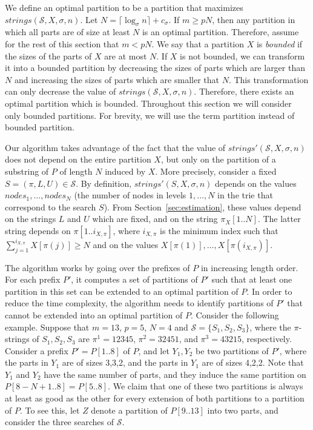 \documentclass[12pt]{article}
\newcommand{\substr}[3]{#1[#2..#3]}
\newcommand{\scheme}{\mathcal{S}}
\newcommand{\partition}{X}
\newcommand{\numstrings}{\mathit{strings}}
\newcommand{\numstringsp}{\numstrings'}
\newcommand{\numnodes}[1]{\mathit{nodes}_{#1}}
\newcommand{\logn}{N}
\newcommand{\lognc}{N}
\newcommand{\ppartition}{Y}
\newcommand{\spartition}{Z}
\begin{document}
We define an optimal partition to be a partition that maximizes
$\numstrings(\scheme,\partition,\sigma,n)$.
Let $\lognc=\lceil\log_{\sigma} n\rceil+c_\sigma$.
If $m \geq p \lognc$, then any partition in which all parts are of size at least
$\lognc$ is an optimal partition.
Therefore, assume for the rest of this section that $m < p \lognc$.
We say that a partition $\partition$ is \emph{bounded} if the sizes of the parts
of $\partition$ are at most $\lognc$.
If $\partition$ is not bounded, we can transform it into a bounded
partition by decreasing the sizes of parts which are larger than $\lognc$
and increasing the sizes of parts which are smaller that $\lognc$.
This transformation 
can only decrease the value of
$\numstrings(\scheme,\partition,\sigma,n)$.
Therefore, there exists an optimal partition which is bounded.
Throughout this section we will consider only bounded partitions.
For brevity, we will use the term partition instead of bounded partition.

Our algorithm takes advantage of the fact that the value of
$\numstringsp(\scheme,\partition,\sigma,n)$ does not depend on the entire
partition $\partition$, but only on the partition of a substring of $P$
of length $\lognc$ induced by $\partition$.
More precisely, consider a fixed $S=(\pi,L,U)\in \scheme$.
By definition,
$\numstringsp(S,\partition,\sigma,n)$ depends on
the values $\numnodes{1},\ldots,\numnodes{\lognc}$ (the number of nodes in
levels $1,\ldots,\logn$ in the trie that correspond to the search $S$).
From Section~\ref{sec:estimation}, these values depend on
the strings $L$ and $U$ which are fixed, and on the string
$\substr{\pi_{\partition}}{1}{\lognc}$.
The latter string depends on $\substr{\pi}{1}{i_{\partition,\pi}}$,
where $i_{\partition,\pi}$ is the minimum index such that
$\sum_{j=1}^{i_{\partition,\pi}} X[\pi(j)] \geq \lognc$
and on the values 
$\partition[\pi(1)],\ldots,\partition[\pi(i_{\partition,\pi})]$.

The algorithm works by going over the prefixes of $P$ in increasing length
order. For each prefix $P'$, it computes a set of partitions of $P'$
such that at least one partition in this set can be extended to an optimal
partition of $P$.
In order to reduce the time complexity, the algorithm needs to identify
partitions of $P'$ that cannot be extended into an optimal partition of $P$.
Consider the following example.
Suppose that $m = 13$, $p = 5$, $\lognc = 4$ and $\scheme = \{S_1,S_2,S_3\}$,
where the $\pi$-strings of $S_1,S_2,S_3$ are $\pi^1 = 12345$, $\pi^2 = 32451$,
and $\pi^3 = 43215$, respectively.
Consider a prefix $P'=\substr{P}{1}{8}$ of $P$, and let
$\ppartition_1,\ppartition_2$ be two partitions of $P'$,
where the parts in $\ppartition_1$ are of sizes 3,3,2,
and the parts in $\ppartition_1$ are of sizes 4,2,2.
Note that $\ppartition_1$ and $\ppartition_2$ have the same number of parts,
and they induce the same partition on $\substr{P}{8-\lognc+1}{8}=\substr{P}{5}{8}$.
We claim that one of these two partitions is always at least as good
as the other for every extension of both partitions to a partition of $P$.
To see this, let $\spartition$ denote a partition of $\substr{P}{9}{13}$ into
two parts, and consider the three searches of $\scheme$.
\end{document}
